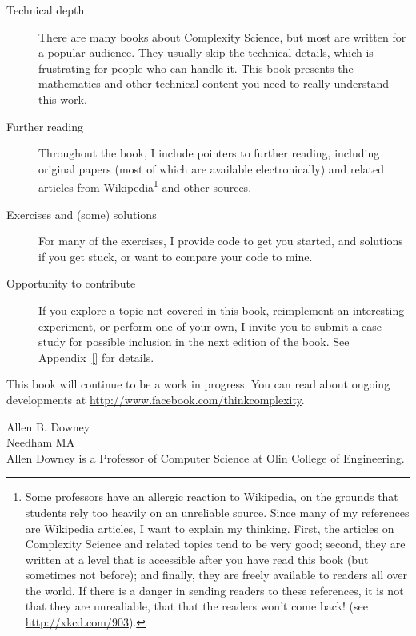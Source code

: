 \documentclass[10pt]{book}
\begin{document}
\begin{description}

\item[Technical depth] There are many books about Complexity
Science, but most are written for a popular audience.  They usually
skip the technical details, which is frustrating for people
who can handle it.  This book presents the mathematics and other
technical content you need to really understand this work.

\item[Further reading] Throughout the book, I include pointers
to further reading, including original papers (most of which
are available electronically) and related articles from
Wikipedia\footnote{Some professors have an allergic reaction
to Wikipedia, on the grounds that students rely too heavily on
an unreliable source.  Since many of my references are
Wikipedia articles, I want to explain my thinking.  First, the
articles on Complexity Science and related topics tend to be very
good; second, they are written at a level that is accessible after
you have read this book (but sometimes not before); and finally,
they are freely available to readers all over the world.  If there
is a danger in sending readers to these references, it is not
that they are unrealiable, that that the readers won't come back!
(see \url{http://xkcd.com/903}).
} and other sources.

\item[Exercises and (some) solutions] For many of the exercises,
I provide code to get you started, and solutions if you get stuck,
or want to compare your code to mine.

\item[Opportunity to contribute] If you explore a topic not covered
in this book, reimplement an interesting experiment, or perform one
of your own, I invite you to submit a case study for possible
inclusion in the next edition of the book.  See Appendix~\ref{}
for details.

\end{description}

This book will continue to be a work in progress.  You can read
about ongoing developments at \url{http://www.facebook.com/thinkcomplexity}.

Allen B. Downey \\
Needham MA\\

Allen Downey is a Professor of Computer Science at
Olin College of Engineering.
\end{document}
